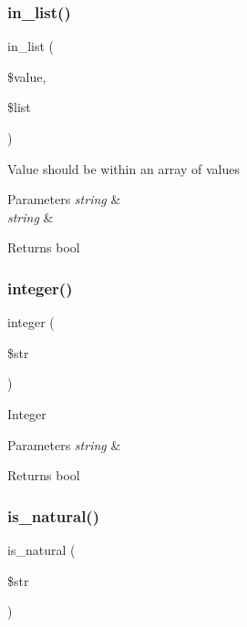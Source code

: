 \subsubsection{\texorpdfstring{in\+\_\+list()}{in\_list()}}
{\footnotesize\ttfamily in\+\_\+list (\begin{DoxyParamCaption}\item[{}]{\$value,  }\item[{}]{\$list }\end{DoxyParamCaption})}

Value should be within an array of values


\begin{DoxyParams}{Parameters}
{\em string} & \\
\hline
{\em string} & \\
\hline
\end{DoxyParams}
\begin{DoxyReturn}{Returns}
bool 
\end{DoxyReturn}
\mbox{\label{class_c_i___form__validation_af1c6586c2e80ccbb28b09803c3b5461c}} 
\subsubsection{\texorpdfstring{integer()}{integer()}}
{\footnotesize\ttfamily integer (\begin{DoxyParamCaption}\item[{}]{\$str }\end{DoxyParamCaption})}

Integer


\begin{DoxyParams}{Parameters}
{\em string} & \\
\hline
\end{DoxyParams}
\begin{DoxyReturn}{Returns}
bool 
\end{DoxyReturn}
\mbox{\label{class_c_i___form__validation_aaf9d0b9bdaaef3658a78dd6a01629e5d}} 
\subsubsection{\texorpdfstring{is\+\_\+natural()}{is\_natural()}}
{\footnotesize\ttfamily is\+\_\+natural (\begin{DoxyParamCaption}\item[{}]{\$str }\end{DoxyParamCaption})}

